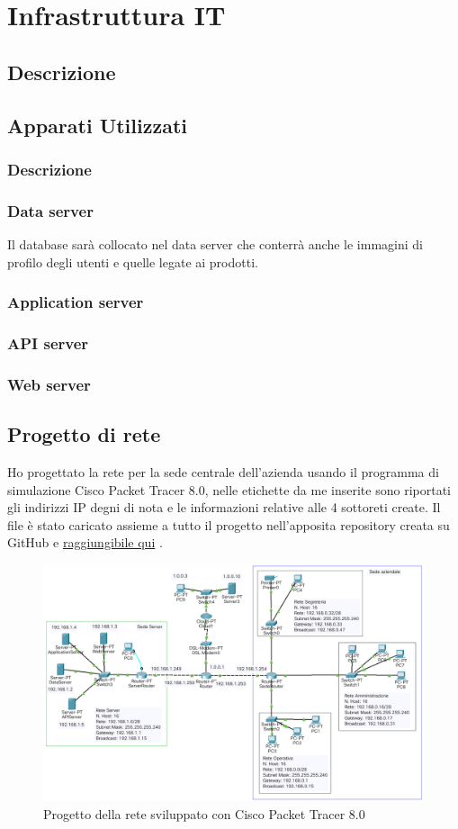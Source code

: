 \section{Infrastruttura IT}
\subsection{Descrizione}
\subsection{Apparati Utilizzati}
\subsubsection{Descrizione}
\subsubsection{Data server}
Il database sarà collocato nel data server che conterrà anche le immagini di profilo degli utenti e quelle legate ai prodotti. 
\subsubsection{Application server}
\subsubsection{API server}
\subsubsection{Web server}
\subsection{Progetto di rete} 
Ho progettato la rete per la sede centrale dell'azienda usando il programma di simulazione Cisco Packet Tracer 8.0, nelle etichette da me inserite sono riportati gli indirizzi IP degni di nota e le informazioni relative alle 4 sottoreti create. Il file è stato caricato assieme a tutto il progetto nell'apposita repository creata su GitHub e \href{https://github.com/MauroPello/elaborato}{raggiungibile qui} \cite{GitHub}. 
\begin{figure}
    \centering\includegraphics[scale=.48]{images/rete.png}
    \caption{Progetto della rete sviluppato con Cisco Packet Tracer 8.0}
\end{figure}
\clearpage